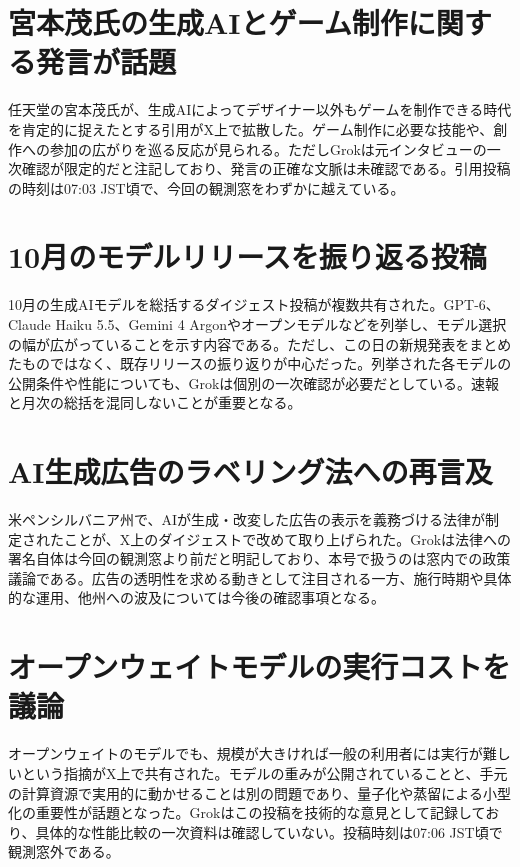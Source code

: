 \section{宮本茂氏の生成AIとゲーム制作に関する発言が話題}
任天堂の宮本茂氏が、生成AIによってデザイナー以外もゲームを制作できる時代を肯定的に捉えたとする引用がX上で拡散した。ゲーム制作に必要な技能や、創作への参加の広がりを巡る反応が見られる。ただしGrokは元インタビューの一次確認が限定的だと注記しており、発言の正確な文脈は未確認である。引用投稿の時刻は07:03 JST頃で、今回の観測窓をわずかに越えている。

\section{10月のモデルリリースを振り返る投稿}
10月の生成AIモデルを総括するダイジェスト投稿が複数共有された。GPT-6、Claude Haiku 5.5、Gemini 4 Argonやオープンモデルなどを列挙し、モデル選択の幅が広がっていることを示す内容である。ただし、この日の新規発表をまとめたものではなく、既存リリースの振り返りが中心だった。列挙された各モデルの公開条件や性能についても、Grokは個別の一次確認が必要だとしている。速報と月次の総括を混同しないことが重要となる。

\section{AI生成広告のラベリング法への再言及}
米ペンシルバニア州で、AIが生成・改変した広告の表示を義務づける法律が制定されたことが、X上のダイジェストで改めて取り上げられた。Grokは法律への署名自体は今回の観測窓より前だと明記しており、本号で扱うのは窓内での政策議論である。広告の透明性を求める動きとして注目される一方、施行時期や具体的な運用、他州への波及については今後の確認事項となる。

\section{オープンウェイトモデルの実行コストを議論}
オープンウェイトのモデルでも、規模が大きければ一般の利用者には実行が難しいという指摘がX上で共有された。モデルの重みが公開されていることと、手元の計算資源で実用的に動かせることは別の問題であり、量子化や蒸留による小型化の重要性が話題となった。Grokはこの投稿を技術的な意見として記録しており、具体的な性能比較の一次資料は確認していない。投稿時刻は07:06 JST頃で観測窓外である。
